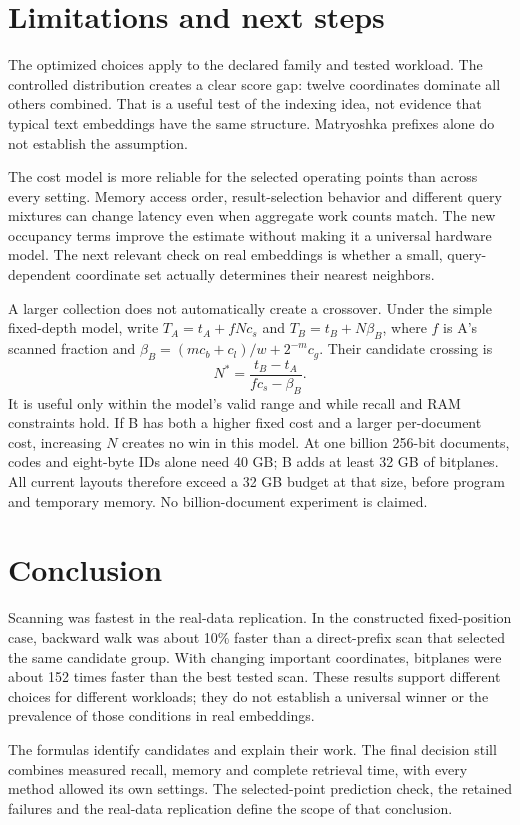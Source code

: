 \newpage
\section{Limitations and next steps}
The optimized choices apply to the declared family and tested workload. The controlled
distribution creates a clear score gap: twelve coordinates dominate all others combined.
That is a useful test of the indexing idea, not evidence that typical text embeddings have
the same structure. Matryoshka prefixes alone do not establish the assumption.

The cost model is more reliable for the selected operating points than across every setting.
Memory access order, result-selection behavior and different query mixtures can change
latency even when aggregate work counts match. The new occupancy terms improve the estimate
without making it a universal hardware model. The next relevant check on real embeddings
is whether a small, query-dependent coordinate set actually determines their nearest neighbors.

A larger collection does not automatically create a crossover. Under the simple fixed-depth
model, write $T_A=t_A+fNc_s$ and $T_B=t_B+N\beta_B$, where $f$ is A's scanned fraction and
$\beta_B=(mc_b+c_l)/w+2^{-m}c_g$. Their candidate crossing is
\[
 N^*=\frac{t_B-t_A}{fc_s-\beta_B}.
\]
It is useful only within the model's valid range and while recall and RAM constraints hold.
If B has both a higher fixed cost and a larger per-document cost, increasing $N$ creates no
win in this model. At one billion 256-bit documents, codes and eight-byte IDs alone need 40 GB;
B adds at least 32 GB of bitplanes. All current layouts therefore exceed a 32 GB budget at
that size, before program and temporary memory. No billion-document experiment is claimed.

\section{Conclusion}
Scanning was fastest in the real-data replication. In the constructed fixed-position case,
backward walk was about 10\% faster than a direct-prefix scan that selected the same candidate
group. With changing important coordinates, bitplanes were about 152 times faster than the
best tested scan. These results support different choices for different workloads; they do
not establish a universal winner or the prevalence of those conditions in real embeddings.

The formulas identify candidates and explain their work. The final decision still combines
measured recall, memory and complete retrieval time, with every method allowed its own
settings. The selected-point prediction check, the retained failures and the real-data
replication define the scope of that conclusion.

